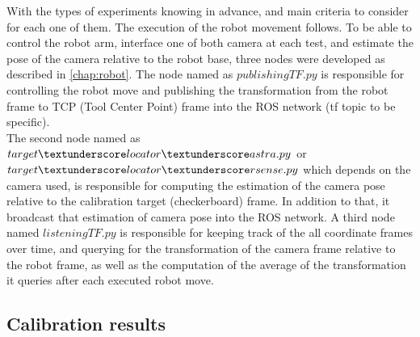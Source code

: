 With the types of experiments knowing in advance, and main criteria to consider for each one of them. The execution of the robot movement follows. To be able to control the robot arm, interface one of both camera at each test, and estimate the pose of the camera relative to the robot base, three nodes were developed as described in \ref{chap:robot}. The node named as $publishingTF.py$ is responsible for controlling the robot move and publishing the transformation from the robot frame to TCP (Tool Center Point) frame into the ROS network (tf topic to be specific). \\
The second node named as $target\textunderscore locator \textunderscore astra.py$ or $target\textunderscore locator \textunderscore rsense.py$  which depends on the camera used, is responsible  for computing the estimation of the camera pose relative to the calibration target (checkerboard) frame. In addition to that, it broadcast that estimation of camera pose into the ROS network. A third node named $listeningTF.py$ is responsible for keeping track of the all coordinate frames over time, and querying for the transformation of the camera frame relative to the robot frame, as well as the computation of the average of the transformation it queries after each executed robot move. 

\subsection{Calibration results}

